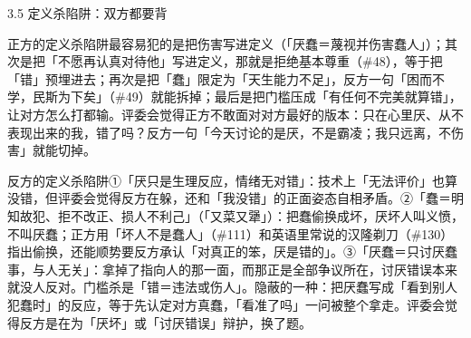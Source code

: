 \documentclass[prep,both]{debate}
\begin{document}
\begin{warnbox}{3.5 定义杀陷阱：双方都要背}
\begin{fields}
\begin{procard}{正方的定义杀陷阱}最容易犯的是把伤害写进定义（「厌蠢＝蔑视并伤害蠢人」）；其次是把「不愿再认真对待他」写进定义，那就是拒绝基本尊重（\#48），等于把「错」预埋进去；再次是把「蠢」限定为「天生能力不足」，反方一句「困而不学，民斯为下矣」（\#49）就能拆掉；最后是把门槛压成「有任何不完美就算错」，让对方怎么打都输。评委会觉得正方不敢面对对方最好的版本：只在心里厌、从不表现出来的我，错了吗？反方一句「今天讨论的是厌，不是霸凌；我只远离，不伤害」就能切掉。\end{procard}
\begin{concard}{反方的定义杀陷阱}①「厌只是生理反应，情绪无对错」：技术上「无法评价」也算没错，但评委会觉得反方在躲，还和「我没错」的正面姿态自相矛盾。②「蠢＝明知故犯、拒不改正、损人不利己」（「又菜又犟」）：把蠢偷换成坏，厌坏人叫义愤，不叫厌蠢；正方用「坏人不是蠢人」（\#111）和英语里常说的汉隆剃刀（\#130）指出偷换，还能顺势要反方承认「对真正的笨，厌是错的」。③「厌蠢＝只讨厌蠢事，与人无关」：拿掉了指向人的那一面，而那正是全部争议所在，讨厌错误本来就没人反对。门槛杀是「错＝违法或伤人」。隐蔽的一种：把厌蠢写成「看到别人犯蠢时」的反应，等于先认定对方真蠢，「看准了吗」一问被整个拿走。评委会觉得反方是在为「厌坏」或「讨厌错误」辩护，换了题。\end{concard}
\end{fields}
\end{warnbox}
\end{document}
